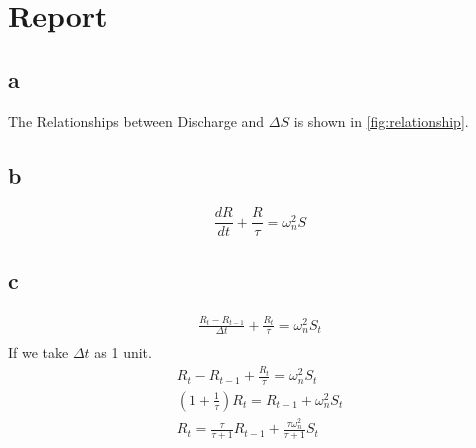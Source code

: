\chapter{Report}
\section{a}
The Relationships between Discharge and $\Delta S$ is shown in \autoref{fig:relationship}.
\begin{figure}[htpb]\centering
	\caption{}
	\label{fig:relationship}
\end{figure}
\section{b}
\begin{equation*}
	\frac{dR}{dt} + \frac{R}{\tau} = \omega^2_n S
\end{equation*}
\section{c}
\begin{gather*}
	\frac{R_t - R_{t-1}}{\Delta t} + \frac{R_t}{\tau} = \omega^2_n S_t \\
\end{gather*}
If we take $\Delta t$ as 1 unit.
\begin{gather*}
	R_t - R_{t-1} + \frac{R_t}{\tau} = \omega^2_n S_t \\
	\left(1+\frac{1}{\tau}\right) R_{t} = R_{t-1} +  \omega^2_n S_t \\
	R_{t} = \frac{\tau}{\tau + 1} R_{t-1} + \frac{\tau \omega_n^2}{\tau + 1}S_t
\end{gather*}
